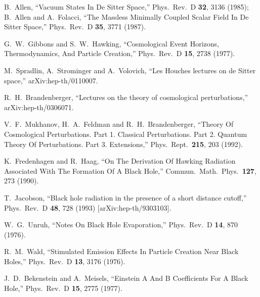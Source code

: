 \documentclass[12pt]{article}
\begin{document}
\begin{thebibliography}{99}
B.~Allen,
``Vacuum States In De Sitter Space,''
Phys.\ Rev.\ D {\bf 32}, 3136 (1985);
B.~Allen and A.~Folacci,
``The Massless Minimally Coupled Scalar Field In De Sitter Space,''
Phys.\ Rev.\ D {\bf 35}, 3771 (1987).

G.~W.~Gibbons and S.~W.~Hawking,
``Cosmological Event Horizons, Thermodynamics, And Particle Creation,''
Phys.\ Rev.\ D {\bf 15}, 2738 (1977).

M.~Spradlin, A.~Strominger and A.~Volovich,
``Les Houches lectures on de Sitter space,''
arXiv:hep-th/0110007.

R.~H.~Brandenberger,
``Lectures on the theory of cosmological perturbations,''
arXiv:hep-th/0306071.

V.~F.~Mukhanov, H.~A.~Feldman and R.~H.~Brandenberger,
``Theory Of Cosmological Perturbations. Part 1. Classical Perturbations. Part 2. Quantum Theory Of Perturbations. Part 3. Extensions,''
Phys.\ Rept.\  {\bf 215}, 203 (1992).

K.~Fredenhagen and R.~Haag,
``On The Derivation Of Hawking Radiation Associated With The Formation Of A Black Hole,''
Commun.\ Math.\ Phys.\  {\bf 127}, 273 (1990).

T.~Jacobson,
``Black hole radiation in the presence of a short distance cutoff,''
Phys.\ Rev.\ D {\bf 48}, 728 (1993)
[arXiv:hep-th/9303103].

W.~G.~Unruh,
``Notes On Black Hole Evaporation,''
Phys.\ Rev.\ D {\bf 14}, 870 (1976).

R.~M.~Wald,
``Stimulated Emission Effects In Particle Creation Near Black Holes,''
Phys.\ Rev.\ D {\bf 13}, 3176 (1976).

J.~D.~Bekenstein and A.~Meisels,
``Einstein A And B Coefficients For A Black Hole,''
Phys.\ Rev.\ D {\bf 15}, 2775 (1977).


\end{thebibliography}
\end{document}
